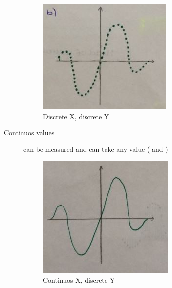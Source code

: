 \begin{description}
		\begin{figure}[!h]
			\centering
			\includegraphics[width=0.7\linewidth]{images_LA/discreteY_discreteX}
			\caption[Discrete X, discrete Y]{Discrete X, discrete Y}
			\label{fig:discreteY_discreteX}
		\end{figure}

	\item[Continuos values] can be measured and can take any value ( and )
		\begin{figure}[!h]
			\centering
			\includegraphics[width=0.7\linewidth]{images_LA/ContinuosX_continuosY}
			\caption{Continuos X, discrete Y}
			\label{fig:ContinuosX_continuosY}
		\end{figure}
		

\end{description}
